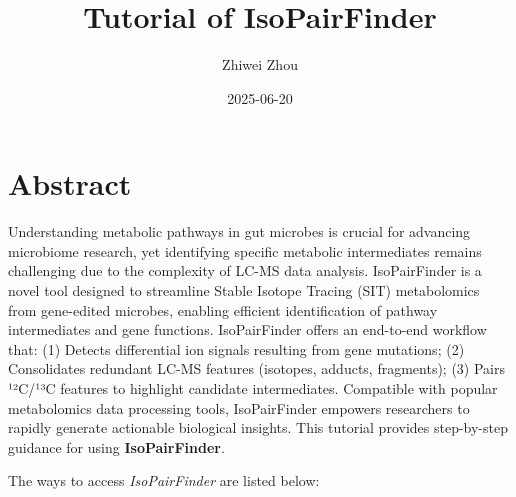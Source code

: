 \documentclass[
  letterpaper,
  DIV=11,
  numbers=noendperiod]{scrreprt}
\title{Tutorial of IsoPairFinder}
\author{Zhiwei Zhou}
\date{2025-06-20}
\renewcommand*\contentsname{Table of contents}
\newcommand\contentsname{Table of contents}
\begin{document}
\maketitle

\renewcommand*\contentsname{Table of contents}
{
\hypersetup{linkcolor=}
\setcounter{tocdepth}{2}
\tableofcontents
}


\chapter*{Abstract}\label{abstract}


Understanding metabolic pathways in gut microbes is crucial for
advancing microbiome research, yet identifying specific metabolic
intermediates remains challenging due to the complexity of LC-MS data
analysis. IsoPairFinder is a novel tool designed to streamline Stable
Isotope Tracing (SIT) metabolomics from gene-edited microbes, enabling
efficient identification of pathway intermediates and gene functions.
IsoPairFinder offers an end-to-end workflow that: (1) Detects
differential ion signals resulting from gene mutations; (2) Consolidates
redundant LC-MS features (isotopes, adducts, fragments); (3) Pairs
¹²C/¹³C features to highlight candidate intermediates. Compatible with
popular metabolomics data processing tools, IsoPairFinder empowers
researchers to rapidly generate actionable biological insights. This
tutorial provides step-by-step guidance for using
\textbf{IsoPairFinder}.

The ways to access \emph{IsoPairFinder} are listed below:
\end{document}
